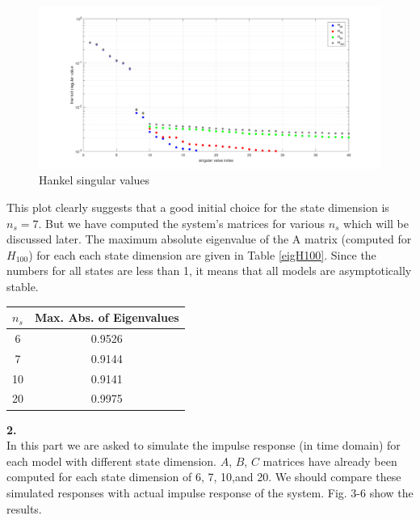 \documentclass[paper=US leter, fontsize=11pt]{scrartcl}
\begin{document}
 \begin{figure}[ht!]  
	\centering  
 
		\centering  
		\includegraphics[scale=0.35,trim={4cm 0 0 0},clip]{task11.png}  
		\caption{Hankel singular values} 
  
	\label{task1} 
\end{figure} 


This plot clearly suggests that a good initial choice for the state dimension is $n_{s} = 7$. But we have computed the system's matrices for various $n_{s}$ which will be discussed later. The maximum absolute eigenvalue of the A matrix (computed for $H_{100}$) for each each state dimension are given in Table \ref{eigH100}. Since the numbers for all states are less than 1, it means that all models are asymptotically stable.

\begin{center} \label{eigH100}
	\vspace{10pt}
	\begin{tabular}{ |c|c| } 
		\hline
		$n_{s}$ & Max. Abs. of Eigenvalues \\ 
		\hline
		6 & 0.9526 \\ 
		\hline
		7 & 0.9144  \\ 
		\hline
		10 & 0.9141  \\
		\hline 
		20 & 0.9975 \\
		\hline
	\end{tabular}
\end{center}
\vspace{30pt}
\textbf{2.} \\
In this part we are asked to simulate the impulse response (in time domain) for each model with different state dimension. $A$, $B$, $C$ matrices have already been computed for each state dimension of 6, 7, 10,and 20. We should compare these simulated responses with actual impulse response of the system. Fig. 3-6 show the results. 
\end{document}
